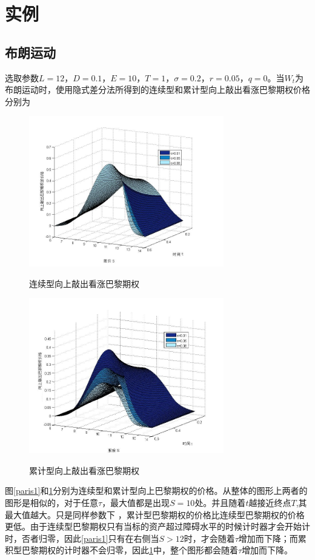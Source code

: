\documentclass{ctexart} %
\begin{document}
\section{实例}
\subsection{布朗运动}
选取参数$L=12$，$D=0.1$，$E=10$，$T=1$，$\sigma=0.2$，$r=0.05$，$q=0$。当$W_t$为布朗运动时，使用隐式差分法所得到的连续型和累计型向上敲出看涨巴黎期权价格分别为
\begin{figure}[H]
\begin{minipage}{0.48\linewidth}
\label{paris1}
\includegraphics[width=8.5cm]{code/paris1.jpg}
\caption{连续型向上敲出看涨巴黎期权}
\end{minipage}
\begin{minipage}{0.48\linewidth}
\label{parisc1}
\includegraphics[width=8.5cm]{code/parisc1.jpg}
\caption{累计型向上敲出看涨巴黎期权}
\end{minipage}
\end{figure}
图\ref{paris1}和\ref{parisc1}分别为连续型和累计型向上巴黎期权的价格。从整体的图形上两者的图形是相似的，对于任意$\tau$，最大值都是出现$S=10$处。并且随着$t$越接近终点$T$,其最大值越大。只是同样参数下 ，累计型巴黎期权的价格比连续型巴黎期权的价格更低。由于连续型巴黎期权只有当标的资产超过障碍水平的时候计时器才会开始计时，否者归零，因此\ref{paris1}只有在右侧当$S>12$时，才会随着$\tau$增加而下降；而累积型巴黎期权的计时器不会归零，因此\ref{parisc1}中，整个图形都会随着$\tau$增加而下降。
\end{document}
